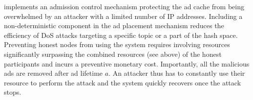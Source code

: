 \sysname implements an admission control mechanism protecting the ad cache from being overwhelmed by an attacker with a limited number of IP addresses. Including a non-deterministic component in the ad placement mechanism reduces the efficiency of DoS attacks targeting a specific topic or a part of the hash space. Preventing honest nodes from using the system requires involving resources significantly surpassing the combined resources (see above) of the honest participants and incurs a preventive monetary cost. Importantly, all the malicious ads are removed after ad lifetime $a$. An attacker thus has to constantly use their resource to perform the attack and the system quickly recovers once the attack stops.